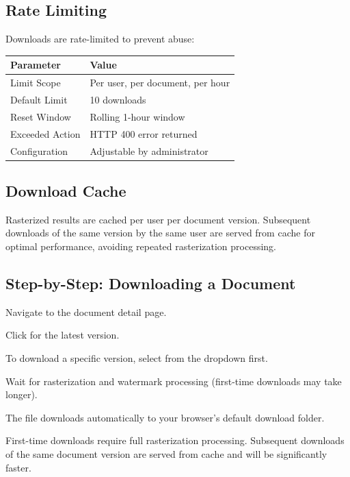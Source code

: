 \subsection{Rate Limiting}

Downloads are rate-limited to prevent abuse:

\begin{tabularx}{\textwidth}{@{} l X @{}}
  \toprule
  \textbf{Parameter} & \textbf{Value} \\
  \midrule
  Limit Scope     & Per user, per document, per hour \\
  Default Limit   & 10 downloads \\
  Reset Window    & Rolling 1-hour window \\
  Exceeded Action & HTTP 400 error returned \\
  Configuration   & Adjustable by administrator \\
  \bottomrule
\end{tabularx}

\subsection{Download Cache}

Rasterized results are cached per user per document version.
Subsequent downloads of the same version by the same user
are served from cache for optimal performance, avoiding
repeated rasterization processing.

\subsection{Step-by-Step: Downloading a Document}
\begin{ugSteps}
  \item Navigate to the document detail page.
  \item Click  for the latest version.
  \item To download a specific version, select from the
         dropdown first.
  \item Wait for rasterization and watermark processing
        (first-time downloads may take longer).
  \item The file downloads automatically to your browser's
        default download folder.
\end{ugSteps}

\begin{ugTip}
  First-time downloads require full rasterization processing.
  Subsequent downloads of the same document version are served
  from cache and will be significantly faster.
\end{ugTip}

\newpage
